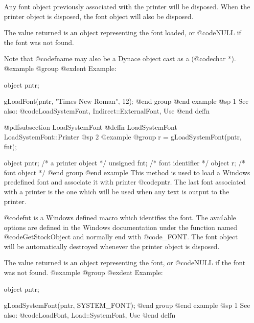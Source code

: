 Any font object previously associated with the printer will be
disposed.  When the printer object is disposed, the font object
will also be disposed.

The value returned is an object representing the font loaded, or
@code{NULL} if the font was not found.

Note that @code{fname} may also be a Dynace object cast as a (@code{char *}).
@example
@group
@exdent Example:

object  pntr;

gLoadFont(pntr, "Times New Roman", 12);
@end group
@end example
@sp 1
See also:  @code{LoadSystemFont, Indirect::ExternalFont, Use}
@end deffn














@pdfsubsection {LoadSystemFont}
@deffn {LoadSystemFont} LoadSystemFont::Printer
@sp 2
@example
@group
r = gLoadSystemFont(pntr, fnt);

object   pntr;  /*  a printer object  */
unsigned fnt;   /*  font identifier  */
object   r;     /*  font object      */
@end group
@end example
This method is used to load a Windows predefined font and associate it
with printer @code{pntr}.  The last font associated with a printer is the
one which will be used when any text is output to the printer.

@code{fnt} is a Windows defined macro which identifies the font.  The
available options are defined in the Windows documentation under the
function named @code{GetStockObject} and normally end with @code{_FONT}.
The font object will be automatically destroyed whenever the printer
object is disposed.

The value returned is an object representing the font, or
@code{NULL} if the font was not found.
@example
@group
@exdent Example:

object  pntr;

gLoadSystemFont(pntr, SYSTEM_FONT);
@end group
@end example
@sp 1
See also:  @code{LoadFont, Load::SystemFont, Use}
@end deffn

















